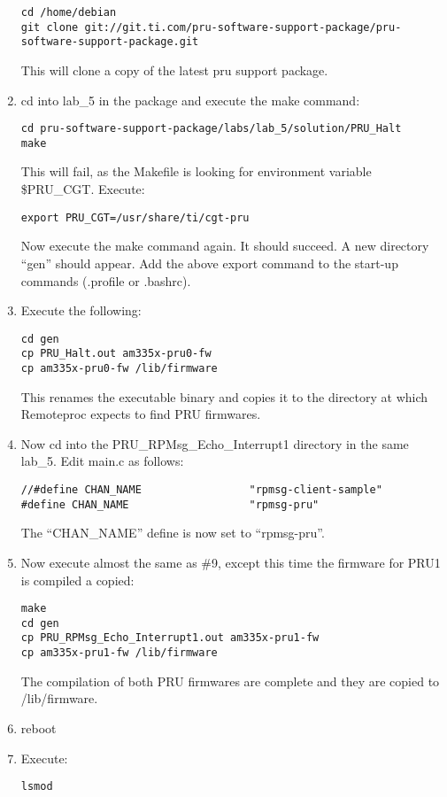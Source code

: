 \begin{enumerate}
\begin{verbatim}
cd /home/debian
git clone git://git.ti.com/pru-software-support-package/pru-software-support-package.git
\end{verbatim}

This will clone a copy of the latest pru support package.
\item  cd into lab\_5 in the package and execute the make command:
\begin{verbatim}
cd pru-software-support-package/labs/lab_5/solution/PRU_Halt
make
\end{verbatim}
This will fail, as the Makefile is looking for environment variable \$PRU\_CGT.  Execute:

\begin{verbatim}
export PRU_CGT=/usr/share/ti/cgt-pru
\end{verbatim}

Now execute the make command again.  It should succeed.  A new directory ``gen'' should appear.  Add the above export command to the start-up commands (.profile or .bashrc).
\item  Execute the following:
\begin{verbatim}
cd gen
cp PRU_Halt.out am335x-pru0-fw
cp am335x-pru0-fw /lib/firmware
\end{verbatim}
This renames the executable binary and copies it to the directory at which Remoteproc expects to find PRU firmwares.
\item  Now cd into the PRU\_RPMsg\_Echo\_Interrupt1 directory in the same lab\_5.
Edit main.c as follows:
\begin{verbatim}
//#define CHAN_NAME					"rpmsg-client-sample"
#define CHAN_NAME					"rpmsg-pru"
\end{verbatim}
The ``CHAN\_NAME'' define is now set to ``rpmsg-pru''.
\item  Now execute almost the same as \#9, except this time the firmware for PRU1 is compiled a copied:
\begin{verbatim}
make
cd gen
cp PRU_RPMsg_Echo_Interrupt1.out am335x-pru1-fw
cp am335x-pru1-fw /lib/firmware
\end{verbatim}
The compilation of both PRU firmwares are complete and they are copied to /lib/firmware.
\item  reboot
\item  Execute:

\begin{verbatim}
lsmod
\end{verbatim}


\end{enumerate}
